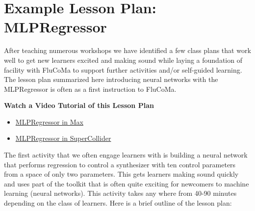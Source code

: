\documentclass{article}
\providecommand{\tightlist}{%
  \setlength{\itemsep}{0pt}\setlength{\parskip}{0pt}}
\begin{document}
\section{Example Lesson Plan: MLPRegressor}\label{example-lesson-plan}

After teaching numerous workshops we have identified a few class plans
that work well to get new learners excited and making sound while laying
a foundation of facility with FluCoMa to support further activities
and/or self-guided learning. The lesson plan summarized here introducing neural networks with the MLPRegressor is often as a first instruction to FluCoMa.

\textbf{Watch a Video Tutorial of this Lesson Plan}

\begin{itemize}
\tightlist
\item
  \href{https://www.youtube.com/watch?v=XfNZzQPdPG0}{MLPRegressor in
  Max}
\item
  \href{https://www.youtube.com/watch?v=mxmMBvi3Cb0}{MLPRegressor in
  SuperCollider}
\end{itemize}

The first activity that we often engage learners with is building a
neural network that performs regression to control a synthesizer with ten control parameters from a space of only two parameters. This
gets learners making sound quickly and uses part of the toolkit that is
often quite exciting for newcomers to machine learning (neural
networks). This activity takes any where from 40-90 minutes depending on
the class of learners. Here is a brief outline of the lesson plan:
\end{document}
